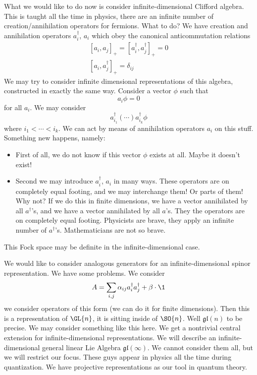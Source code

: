What we would like to do now is consider infinite-dimensional
Clifford algebra. This is taught all the time in physics, there
are an infinite number of creation/annihilation operators for
fermions. What to do? We have creation and annihilation operators
$a^{\dagger}_{i}$, $a_{i}$ which obey the canonical
anticommutation relations
\begin{subequations}
\begin{align}
[a_{i},a_{j}]_{+} = [a^{\dagger}_{i}, a^{\dagger}_{j}]_{+} = 0\\
[a_{i}, a^{\dagger}_{j}]_{+} = \delta_{ij}
\end{align}
\end{subequations}
We may try to consider infinite dimensional representations of
this algebra, constructed in exactly the same way. Consider a
vector $\phi$ such that
\begin{equation}
a_{i}\phi = 0
\end{equation}
for all $a_{i}$. We may consider
\begin{equation}
a^{\dagger}_{i_{1}}(\cdots)a^{\dagger}_{i_{k}}\phi
\end{equation}
where $i_{1}<\cdots<i_{k}$. We can act by means of annihilation
operators $a_{i}$ on this stuff. Something new happens, namely:
\begin{itemize}
\item First of all, we do not know if this vector $\phi$ exists
  at all. Maybe it doesn't exist!
\item Second we may introduce $a^{\dagger}_{i}$, $a_{i}$ in many
  ways. These operators are on completely equal footing, and we
  may interchange them! Or parts of them! Why not? If we do this
  in finite dimensions, we have a vector annihilated by all
  $a^{\dagger}$'s, and we have a vector annihilated by all
  $a$'s. They the operators are on completely equal
  footing. Physicists are brave, they apply an infinite number of
  $a^{\dagger}$'s. Mathematicians are not so brave.
\end{itemize}
This Fock space may be definite in the infinite-dimensional case.

We would like to consider analogous generators for an
infinite-dimensional spinor representation. We have some
problems. We consider
\begin{equation}
A = \sum_{i,j} \alpha_{ij}a^{\dagger}_{i}a^{\dagger}_{j}+\beta\cdot\1
\end{equation}
we consider operators of this form (we can do it for finite
dimensions). Then this is a representation of $\GL{n}$, it is
sitting inside of $\SO{n}$. Well $\mathfrak{gl}(n)$ to be
precise. We may consider something like this here. We get a
nontrivial central extension for infinite-dimensional
representations. We will describe an infinite-dimensional general
linear Lie Algebra $\mathfrak{gl}(\infty)$. We cannot consider
them all, but we will restrict our focus. These guys appear in
physics all the time during quantization. We have projective
representations as our tool in quantum theory.
